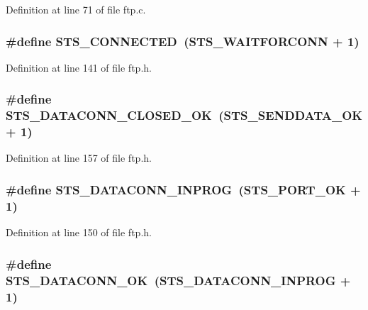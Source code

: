 Definition at line 71 of file ftp.c.

\hypertarget{group__ftp_gae13a7a1a411918b955f9fc4f565e69f1}{
\subsubsection[{STS\_\-CONNECTED}]{\setlength{\rightskip}{0pt plus 5cm}\#define STS\_\-CONNECTED~(STS\_\-WAITFORCONN + 1)}}
\label{group__ftp_gae13a7a1a411918b955f9fc4f565e69f1}


Definition at line 141 of file ftp.h.

\hypertarget{group__ftp_ga3f47db8c6627d293105434023a806837}{
\subsubsection[{STS\_\-DATACONN\_\-CLOSED\_\-OK}]{\setlength{\rightskip}{0pt plus 5cm}\#define STS\_\-DATACONN\_\-CLOSED\_\-OK~(STS\_\-SENDDATA\_\-OK + 1)}}
\label{group__ftp_ga3f47db8c6627d293105434023a806837}


Definition at line 157 of file ftp.h.

\hypertarget{group__ftp_gaa08b829702c3b69780e270df8aca352c}{
\subsubsection[{STS\_\-DATACONN\_\-INPROG}]{\setlength{\rightskip}{0pt plus 5cm}\#define STS\_\-DATACONN\_\-INPROG~(STS\_\-PORT\_\-OK + 1)}}
\label{group__ftp_gaa08b829702c3b69780e270df8aca352c}


Definition at line 150 of file ftp.h.

\hypertarget{group__ftp_gab7488a1a393b4e92eb386754bad49fc4}{
\subsubsection[{STS\_\-DATACONN\_\-OK}]{\setlength{\rightskip}{0pt plus 5cm}\#define STS\_\-DATACONN\_\-OK~(STS\_\-DATACONN\_\-INPROG + 1)}}
\label{group__ftp_gab7488a1a393b4e92eb386754bad49fc4}


